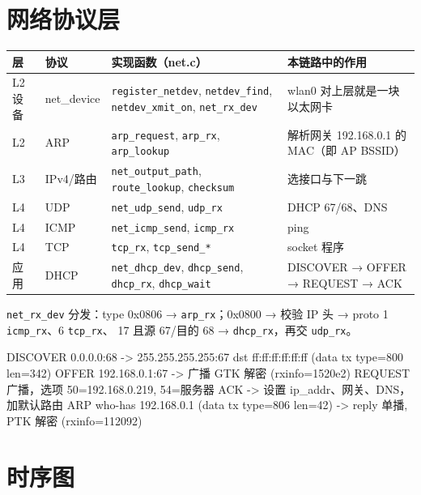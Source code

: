 \documentclass[UTF8,zihao=-4,fontset=none]{ctexart}
\newcommand{\fn}[1]{\texttt{#1}}
\begin{document}
\section{网络协议层}

\begin{longtable}{p{14mm}p{20mm}p{56mm}p{58mm}}
\toprule
层 & 协议 & 实现函数（net.c） & 本链路中的作用 \\ \midrule \endhead
L2 设备 & net\_device & \fn{register\_netdev}, \fn{netdev\_find}, \fn{netdev\_xmit\_on}, \fn{net\_rx\_dev} & wlan0 对上层就是一块以太网卡 \\
L2 & ARP & \fn{arp\_request}, \fn{arp\_rx}, \fn{arp\_lookup} & 解析网关 192.168.0.1 的 MAC（即 AP BSSID） \\
L3 & IPv4/路由 & \fn{net\_output\_path}, \fn{route\_lookup}, \fn{checksum} & 选接口与下一跳 \\
L4 & UDP & \fn{net\_udp\_send}, \fn{udp\_rx} & DHCP 67/68、DNS \\
L4 & ICMP & \fn{net\_icmp\_send}, \fn{icmp\_rx} & ping \\
L4 & TCP & \fn{tcp\_rx}, \fn{tcp\_send\_*} & socket 程序 \\
应用 & DHCP & \fn{net\_dhcp\_dev}, \fn{dhcp\_send}, \fn{dhcp\_rx}, \fn{dhcp\_wait} & DISCOVER → OFFER → REQUEST → ACK \\
\bottomrule
\end{longtable}

\fn{net\_rx\_dev} 分发：type 0x0806 → \fn{arp\_rx}；0x0800 → 校验 IP 头 → proto 1 \fn{icmp\_rx}、6 \fn{tcp\_rx}、
17 且源 67/目的 68 → \fn{dhcp\_rx}，再交 \fn{udp\_rx}。

\begin{code}
DISCOVER 0.0.0.0:68 -> 255.255.255.255:67  dst ff:ff:ff:ff:ff:ff  (data tx type=800 len=342)
OFFER    192.168.0.1:67 -> 广播             GTK 解密             (rxinfo=1520e2)
REQUEST  广播，选项 50=192.168.0.219, 54=服务器
ACK      -> 设置 ip_addr、网关、DNS，加默认路由
ARP      who-has 192.168.0.1 (data tx type=806 len=42) -> reply 单播, PTK 解密 (rxinfo=112092)
\end{code}

\section{时序图}
\end{document}
